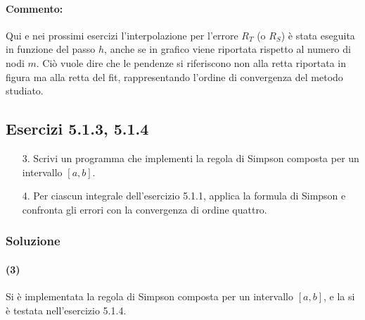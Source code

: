 \documentclass[letterpaper, 12pt]{article}
\numberwithin{equation}{section}    %
\begin{document}
\paragraph{Commento:}Qui e nei prossimi esercizi l'interpolazione per l'errore $R_T$ (o $R_S$) è stata eseguita
in funzione del passo $h$, anche se in grafico viene riportata rispetto al numero di nodi $m$. Ciò vuole
dire che le pendenze si riferiscono non alla retta riportata in figura ma alla retta del fit, rappresentando
l'ordine di convergenza del metodo studiato.  

\subsection{Esercizi 5.1.3, 5.1.4}
\begin{enumerate}
    \item[3.] Scrivi un programma che implementi la regola di Simpson composta per un intervallo $[a,b]$.
    \item[4.] Per ciascun integrale dell'esercizio 5.1.1, applica la formula di Simpson e confronta gli errori con 
    la convergenza di ordine quattro.
\end{enumerate}

\subsubsection{Soluzione}
\paragraph{(3)}Si è implementata la regola di Simpson composta per un intervallo $[a,b]$,
e la si è testata nell'esercizio 5.1.4. \\
\end{document}
